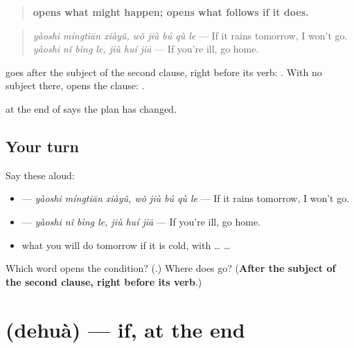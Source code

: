 \begin{grammarlens}[title={Grammar Lens: \zh{要是} … \zh{就} …, if and then}]
\begin{quote}
\textbf{ opens what might happen;  opens what follows if it does.}
\end{quote}

\begin{quote}
\textbf{ } \emph{yàoshi míngtiān xiàyǔ, wǒ jiù bú qù le} — If it rains tomorrow, I won't go. \textbf{ } \emph{yàoshi nǐ bìng le, jiù huí jiā} — If you're ill, go home.
\end{quote}

 goes after the subject of the second clause, right before its verb: . With no subject there,  opens the clause: .

 at the end of  says the plan has changed.
\end{grammarlens}

\subsection*{Your turn}
Say these aloud:

\begin{itemize}
\raggedright
  \item {}  — \emph{yàoshi míngtiān xiàyǔ, wǒ jiù bú qù le} — If it rains tomorrow, I won't go.
  \item {}  — \emph{yàoshi nǐ bìng le, jiù huí jiā} — If you're ill, go home.
  \item what you will do tomorrow if it is cold, with  …  …
\end{itemize}

\begin{tcolorbox}[breakable,colback=teal!4,colframe=teal!35!black,title={Before you move on}]
Which word opens the condition? (\textbf{}.) Where does  go? (\textbf{After the subject of the second clause, right before its verb}.)
\end{tcolorbox}
\section[\texorpdfstring{\zh{的话} (dehuà)}{的话 (dehuà)}]{ (dehuà) — if, at the end}

\label{lesson:ZH-C288-dehua}



